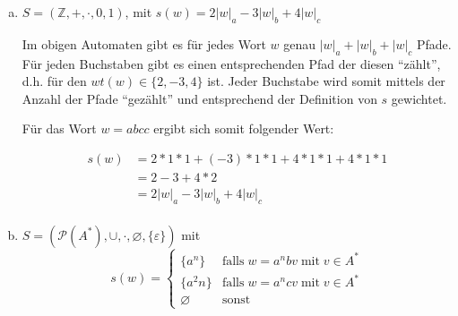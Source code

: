 \documentclass{scrartcl}
\begin{document}
\begin{enumerate}[(a)]
    \item $S = (\mathbb{Z}, +, \cdot, 0, 1)$, mit $s(w) = 2|w|_a -3|w|_b + 4|w|_c$

      \begin{figure}[ht]
        \centering
      \end{figure}

      Im obigen Automaten gibt es für jedes Wort $w$ genau $|w|_a + |w|_b + |w|_c$ Pfade. Für jeden Buchstaben gibt es einen entsprechenden Pfad der diesen \enquote{zählt}, d.h. für den $wt(w) \in \{2, -3, 4\}$ ist. Jeder Buchstabe wird somit mittels der Anzahl der Pfade \enquote{gezählt} und entsprechend der Definition von $s$ gewichtet.

      Für das Wort $w = abcc$ ergibt sich somit folgender Wert:

      \begin{align*}
        s(w) &= 2 * 1 * 1 + (-3) * 1 * 1 + 4 * 1 * 1 + 4 * 1 * 1\\
             &= 2 - 3 + 4 * 2\\
             &= 2 |w|_a - 3 |w|_b + 4 |w|_c\\
      \end{align*}

    \item $S = (\mathcal{P}(A^*), \cup, \cdot, \varnothing, \{\varepsilon\})$ mit
      \begin{equation*}
        s(w) = \begin{cases}
          \{a^n\}     &\text{falls}\;w = a^nbv\;\text{mit}\;v \in A^*\\
          \{a^2n\}    &\text{falls}\;w=a^ncv\;\text{mit}\;v \in A^*\\
          \varnothing &\text{sonst}
        \end{cases}
      \end{equation*}


\end{enumerate}
\end{document}
